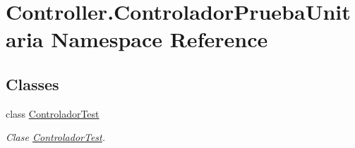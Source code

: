 \hypertarget{namespace_controller_1_1_controlador_prueba_unitaria}{}\section{Controller.\+Controlador\+Prueba\+Unitaria Namespace Reference}
\label{namespace_controller_1_1_controlador_prueba_unitaria}
\subsection*{Classes}
\begin{DoxyCompactItemize}
\item 
class \hyperlink{class_controller_1_1_controlador_prueba_unitaria_1_1_controlador_test}{Controlador\+Test}
\begin{DoxyCompactList}\small\item\em Clase \hyperlink{class_controller_1_1_controlador_prueba_unitaria_1_1_controlador_test}{Controlador\+Test}. \end{DoxyCompactList}\end{DoxyCompactItemize}
